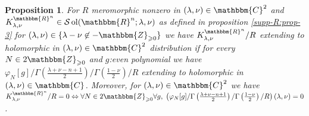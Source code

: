 \documentclass{article}
\newcommand{\nin}{\not\in}
\newcommand{\tmop}[1]{\ensuremath{\operatorname{#1}}}
\newtheorem{proposition}{Proposition}
{\theorembodyfont{\rmfamily}\newtheorem{remark}{Remark}}
\begin{document}
\begin{proposition}
  \label{k-finite:prop-KR-hook-2}For $R$ meromorphic nonzero in $(\lambda,
  \nu) \in \mathbbm{C}^2$ and $K_{\lambda, \nu}^{\mathbbm{R}^n} \in
  \mathcal{S} \tmop{ol} (\mathbbm{R}^n ; \lambda, \nu)$ as defined in
  proposition \ref{supp-R:prop-3} for $(\lambda, \nu) \in \{ \lambda - \nu
  \nin -\mathbbm{Z}_{\geqslant 0} \}$ we have $K_{\lambda,
  \nu}^{\mathbbm{R}^n} / R$ extending to holomorphic in $(\lambda, \nu) \in
  \mathbbm{C}^2$ distribution if for every $N \in 2\mathbbm{Z}_{\geqslant 0}$
  and $g$:even polynomial we have $\varphi_N [g] / \Gamma \left( \frac{\lambda
  + \nu - n + 1}{2} \right) / \Gamma \left( \frac{1 - \nu}{2} \right) / R$
  extending to holomorphic in $(\lambda, \nu) \in \mathbbm{C}$. Moreover, for
  $(\lambda, \nu) \in \mathbbm{C}^2$ we have $K_{\lambda, \nu}^{\mathbbm{R}^n}
  / R = 0 \Leftrightarrow \forall N \in 2\mathbbm{Z}_{\geqslant 0} \forall g,
  \; \left( \varphi_N [g] / \Gamma \left( \frac{\lambda + \nu - n + 1}{2}
  \right) / \Gamma \left( \frac{1 - \nu}{2} \right) / R \right) (\lambda, \nu)
  = 0$.
\end{proposition}
\end{document}
